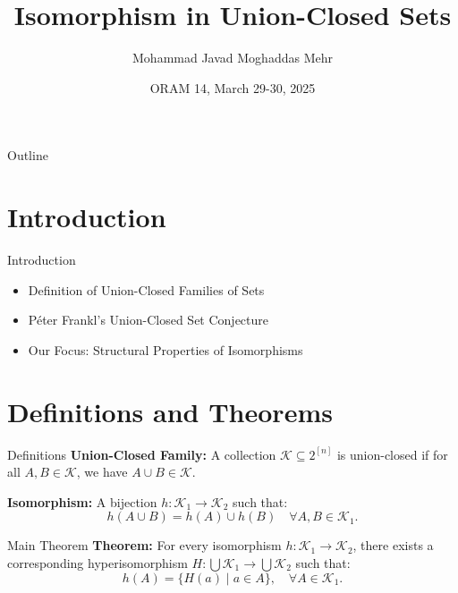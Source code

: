 \documentclass{beamer}
\title{Isomorphism in Union-Closed Sets}
\author{Mohammad Javad Moghaddas Mehr}
\date{ORAM 14, March 29-30, 2025}
\begin{document}
\begin{frame}
    \titlepage
\end{frame}

\begin{frame}{Outline}
    \tableofcontents
\end{frame}

\section{Introduction}
\begin{frame}{Introduction}
    \begin{itemize}
        \item Definition of Union-Closed Families of Sets
        \item Péter Frankl's Union-Closed Set Conjecture
        \item Our Focus: Structural Properties of Isomorphisms
    \end{itemize}
\end{frame}

\section{Definitions and Theorems}
\begin{frame}{Definitions}
    \textbf{Union-Closed Family:} A collection $\mathcal{K} \subseteq 2^{[n]}$ is union-closed if for all $A, B \in \mathcal{K}$, we have $A \cup B \in \mathcal{K}$.

    \vspace{1em}
    \textbf{Isomorphism:} A bijection $h: \mathcal{K}_1 \to \mathcal{K}_2$ such that:
    \begin{equation*}
        h(A \cup B) = h(A) \cup h(B) \quad \forall A, B \in \mathcal{K}_1.
    \end{equation*}
\end{frame}

\begin{frame}{Main Theorem}
    \textbf{Theorem:} For every isomorphism $h: \mathcal{K}_1 \to \mathcal{K}_2$, there exists a corresponding hyperisomorphism $H: \bigcup \mathcal{K}_1 \to \bigcup \mathcal{K}_2$ such that:
    \begin{equation*}
        h(A) = \{H(a) \mid a \in A\}, \quad \forall A \in \mathcal{K}_1.
    \end{equation*}
\end{frame}
\end{document}
